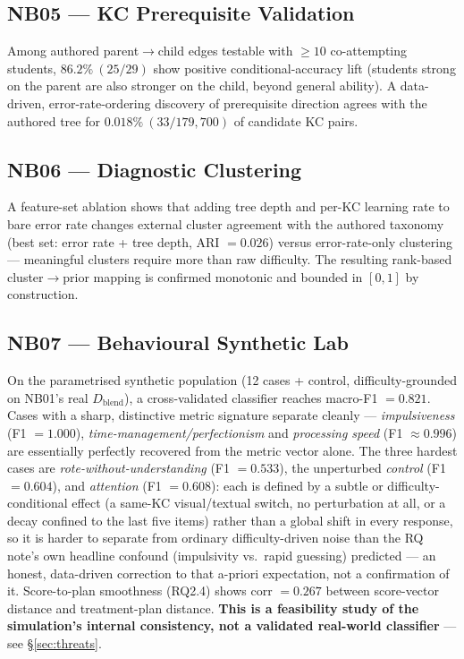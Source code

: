 \documentclass[11pt]{article}
\begin{document}
\subsection{NB05 --- KC Prerequisite Validation}
Among authored parent$\to$child edges testable with $\geq10$ co-attempting students, $86.2\%\ (25/29)$ show positive conditional-accuracy lift (students strong on the parent are also stronger on the child, beyond general ability). A data-driven, error-rate-ordering discovery of prerequisite direction agrees with the authored tree for $0.018\%\ (33/179{,}700)$ of candidate KC pairs.

\subsection{NB06 --- Diagnostic Clustering}
A feature-set ablation shows that adding tree depth and per-KC learning rate to bare error rate changes external cluster agreement with the authored taxonomy (best set: error rate + tree depth, ARI $=0.026$) versus error-rate-only clustering --- meaningful clusters require more than raw difficulty. The resulting rank-based cluster$\to$prior mapping is confirmed monotonic and bounded in $[0,1]$ by construction.

\subsection{NB07 --- Behavioural Synthetic Lab}
On the parametrised synthetic population (12 cases + control, difficulty-grounded on NB01's real $D_{\text{blend}}$), a cross-validated classifier reaches macro-F1 $=0.821$. Cases with a sharp, distinctive metric signature separate cleanly --- \emph{impulsiveness} (F1 $=1.000$), \emph{time-management/perfectionism} and \emph{processing speed} (F1 $\approx0.996$) are essentially perfectly recovered from the metric vector alone. The three hardest cases are \emph{rote-without-understanding} (F1 $=0.533$), the unperturbed \emph{control} (F1 $=0.604$), and \emph{attention} (F1 $=0.608$): each is defined by a subtle or difficulty-conditional effect (a same-KC visual/textual switch, no perturbation at all, or a decay confined to the last five items) rather than a global shift in every response, so it is harder to separate from ordinary difficulty-driven noise than the RQ note's own headline confound (impulsivity vs.\ rapid guessing) predicted --- an honest, data-driven correction to that a-priori expectation, not a confirmation of it. Score-to-plan smoothness (RQ2.4) shows corr $=0.267$ between score-vector distance and treatment-plan distance. \textbf{This is a feasibility study of the simulation's internal consistency, not a validated real-world classifier} --- see \S\ref{sec:threats}.
\end{document}
